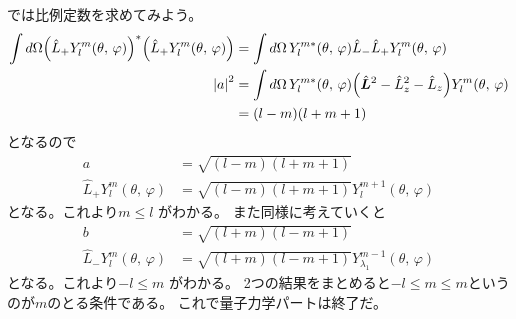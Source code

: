 \documentclass[../../master.tex]{subfiles}
\begin{document}
では比例定数を求めてみよう。
\begin{align}
	\int d\Omega\qty(\hat{L}_+ Y_{l}^m(\theta,\,\varphi))^*
	\qty(\hat{L}_+ Y_{l}^m(\theta,\,\varphi))
	          & = \int d\Omega\, Y_{l}^{m*}(\theta,\,\varphi)\hat{L}_-\hat{L}_+Y_{l}^m(\theta,\,\varphi)                           \\
	\abs{a}^2 & =\int d\Omega\, Y_{l}^{m*}(\theta,\,\varphi)\qty(\hat{\vb*{L}}^2 -\hat{L}_z^2 -\hat{L}_z)Y_{l}^m(\theta,\,\varphi) \\
	          & =(l-m)(l+m+1)
\end{align}
となるので
\begin{align}
	a                                & = \sqrt{(l-m)(l+m+1)}                            \\
	\hat{L}_+Y_l^m(\theta,\,\varphi) & = \sqrt{(l-m)(l+m+1)}Y_l^{m+1}(\theta,\,\varphi)
\end{align}
となる。これより\(m\leq l\) がわかる。
また同様に考えていくと
\begin{align}
	b                                & = \sqrt{(l+m)(l-m+1)}                                      \\
	\hat{L}_-Y_l^m(\theta,\,\varphi) & = \sqrt{(l+m)(l-m+1)}Y_{\lambda_1}^{m-1}(\theta,\,\varphi)
\end{align}
となる。これより\(-l\leq m\) がわかる。
2つの結果をまとめると\(-l \leq m \leq m\)というのが\(m\)のとる条件である。
これで量子力学パートは終了だ。
\end{document}
